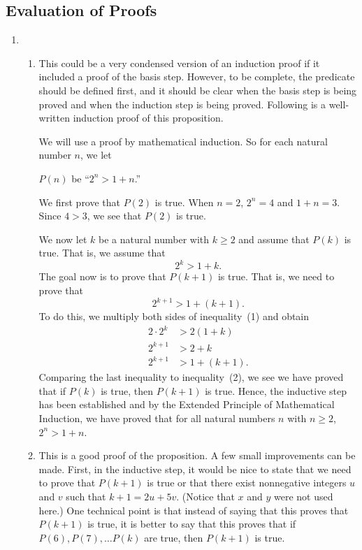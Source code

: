 \subsection*{Evaluation of Proofs}
\setcounter{oldenumi}{\theenumi}
\begin{enumerate} \setcounter{enumi}{\theoldenumi}
\item \begin{enumerate}
\item This could be a very condensed version of an induction proof if it included a proof of the basis step.  However, to be complete, the predicate should be defined first, and it should be clear when the basis step is being proved and when the induction step is being proved.  Following is a well-written induction proof of this proposition.

\setcounter{equation}{0}
\begin{myproof}
We will use a proof by mathematical induction.  So for each natural number $n$, we let
\begin{center}
$P(n)$ be ``$2^n > 1+n$.''
\end{center}
We first prove that $P(2)$ is true.  When $n = 2$, $2^n = 4$ and $1 + n = 3$.  Since $4 > 3$, we see that $P(2)$ is true.

We now let $k$ be a natural number with $k \geq 2$ and assume that $P(k)$ is true.  That is, we assume that
\begin{equation}
2^k > 1 + k.
\end{equation}
The goal now is to prove that $P(k + 1)$ is true.  That is, we need to prove that
\begin{equation}
2^{k + 1} > 1 + (k + 1).
\end{equation}
To do this, we multiply both sides of inequality~(1) and obtain
\begin{align*}
2 \cdot 2^k &> 2(1 + k) \\
  2^{k + 1} &> 2 + k \\
  2^{k + 1} &> 1 + (k + 1).
\end{align*}
Comparing the last inequality to inequality~(2), we see we have proved that if $P(k)$ is true, then $P(k + 1)$ is true.  Hence, the inductive step has been established and by the Extended Principle of Mathematical Induction, we have proved that for all natural numbers $n$ with 
$n \geq 2$, $2^n > 1 + n$.
\end{myproof}

\item This is a good proof of the proposition.  A few small improvements can be made.  First, in the inductive step, it would be nice to state that we need to prove that $P(k + 1)$ is true or that there exist nonnegative integers $u$ and $v$ such that $k + 1 = 2u + 5v$.  (Notice that $x$ and 
$y$ were not used here.)  One technical point is that instead of saying that this proves that 
$P(k + 1)$ is true, it is better to say that this proves that if $P(6 ), P (7 ), \ldots P (k )$ are true, then $P(k + 1)$ is true.


\end{enumerate}
\end{enumerate}
